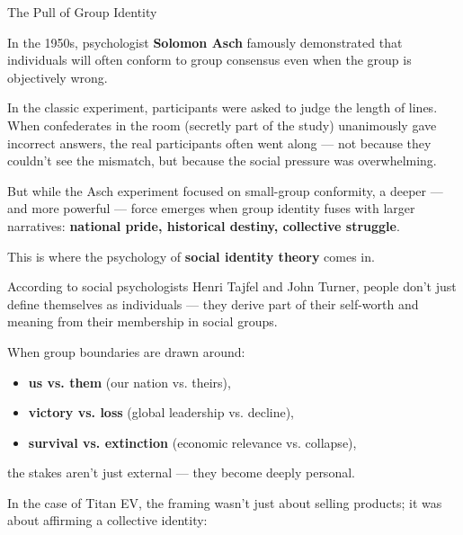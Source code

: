 \begin{PsychologicalSidebar}{The Pull of Group Identity}

    In the 1950s, psychologist \textbf{Solomon Asch} famously demonstrated that individuals will often conform to group consensus even when the group is objectively wrong.
    
    \medskip
    
    In the classic experiment, participants were asked to judge the length of lines.  
    When confederates in the room (secretly part of the study) unanimously gave incorrect answers, the real participants often went along — not because they couldn’t see the mismatch, but because the social pressure was overwhelming.
    
    \medskip
    
    But while the Asch experiment focused on small-group conformity, a deeper — and more powerful — force emerges when group identity fuses with larger narratives:  
    \textbf{national pride, historical destiny, collective struggle}.
    
    \medskip
    
    This is where the psychology of \textbf{social identity theory} comes in.
    
    \medskip
    
    According to social psychologists Henri Tajfel and John Turner, people don’t just define themselves as individuals —  
    they derive part of their self-worth and meaning from their membership in social groups.
    
    \medskip
    
    When group boundaries are drawn around:

    \medskip

    \begin{itemize}
        \item \textbf{us vs. them} (our nation vs. theirs),
        \item \textbf{victory vs. loss} (global leadership vs. decline),
        \item \textbf{survival vs. extinction} (economic relevance vs. collapse),
    \end{itemize}

    \medskip

    the stakes aren’t just external — they become deeply personal.
    
    \medskip
    
    In the case of Titan EV, the framing wasn’t just about selling products;  
    it was about affirming a collective identity:


\end{PsychologicalSidebar}
